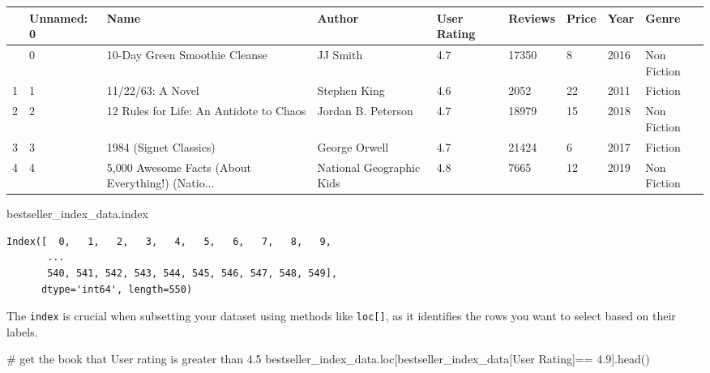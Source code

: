 \documentclass[
  letterpaper,
  DIV=11,
  numbers=noendperiod]{scrreprt}
\newenvironment{Shaded}{\begin{snugshade}}{\end{snugshade}}
\newcommand{\CommentTok}[1]{\textcolor[rgb]{0.37,0.37,0.37}{#1}}
\newcommand{\FloatTok}[1]{\textcolor[rgb]{0.68,0.00,0.00}{#1}}
\newcommand{\NormalTok}[1]{\textcolor[rgb]{0.00,0.23,0.31}{#1}}
\newcommand{\OperatorTok}[1]{\textcolor[rgb]{0.37,0.37,0.37}{#1}}
\newcommand{\StringTok}[1]{\textcolor[rgb]{0.13,0.47,0.30}{#1}}
\begin{document}
\begin{longtable}[]{@{}lllllllll@{}}
\toprule\noalign{}
& Unnamed: 0 & Name & Author & User Rating & Reviews & Price & Year &
Genre \\
\midrule\noalign{}
\endhead
\bottomrule\noalign{}
\endlastfoot
0 & 0 & 10-Day Green Smoothie Cleanse & JJ Smith & 4.7 & 17350 & 8 &
2016 & Non Fiction \\
1 & 1 & 11/22/63: A Novel & Stephen King & 4.6 & 2052 & 22 & 2011 &
Fiction \\
2 & 2 & 12 Rules for Life: An Antidote to Chaos & Jordan B. Peterson &
4.7 & 18979 & 15 & 2018 & Non Fiction \\
3 & 3 & 1984 (Signet Classics) & George Orwell & 4.7 & 21424 & 6 & 2017
& Fiction \\
4 & 4 & 5,000 Awesome Facts (About Everything!) (Natio... & National
Geographic Kids & 4.8 & 7665 & 12 & 2019 & Non Fiction \\
\end{longtable}

\begin{Shaded}
\begin{Highlighting}[]
\NormalTok{bestseller\_index\_data.index}
\end{Highlighting}
\end{Shaded}

\begin{verbatim}
Index([  0,   1,   2,   3,   4,   5,   6,   7,   8,   9,
       ...
       540, 541, 542, 543, 544, 545, 546, 547, 548, 549],
      dtype='int64', length=550)
\end{verbatim}

The \texttt{index} is crucial when subsetting your dataset using methods
like \texttt{loc{[}{]}}, as it identifies the rows you want to select
based on their labels.

\begin{Shaded}
\begin{Highlighting}[]
\CommentTok{\# get the book that User rating is greater than 4.5}
\NormalTok{bestseller\_index\_data.loc[bestseller\_index\_data[}\StringTok{\textquotesingle{}User Rating\textquotesingle{}}\NormalTok{]}\OperatorTok{==} \FloatTok{4.9}\NormalTok{].head()}
\end{Highlighting}
\end{Shaded}
\end{document}
